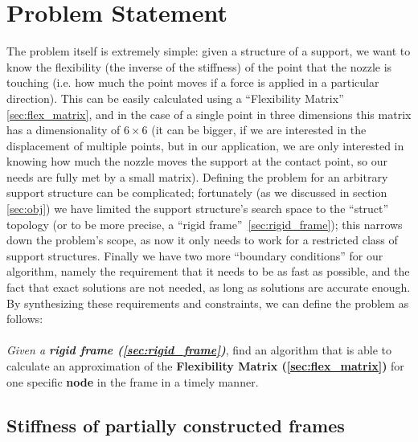 \section{Problem Statement}
\label{sec:stiff_problem_statement}
The problem itself is extremely simple: given a structure of a support, we want to know the flexibility (the inverse of the stiffness)
of the point that the nozzle is touching
(i.e. how much the point moves if a force is applied in a particular direction).
This can be easily calculated using a ``Flexibility Matrix'' \ref{sec:flex_matrix}, and in the case of a
single point in three dimensions this matrix has a dimensionality of $6 \times  6$ (it can be bigger, if we are interested in the 
displacement of multiple points, but in our application, we are only interested in knowing how much the nozzle moves
the support at the contact point, so our needs are fully met by a small matrix).
Defining the problem for an arbitrary support structure can be complicated; fortunately (as we discussed in section \ref{sec:obj})
we have limited the support structure's search space to the ``struct'' topology (or to be more precise, a ``rigid frame''~\ref{sec:rigid_frame});
this narrows down the problem's scope, as now it only needs to work for a restricted class of support structures.
Finally we have two more ``boundary conditions'' for our algorithm, namely the requirement that it needs to be as fast as possible, and the fact 
that exact solutions are not needed, as long as solutions are accurate enough. 
By synthesizing these requirements and constraints, we can define the problem as follows:
\\
\\
\noindent\textit{Given a \textbf{rigid frame (\ref{sec:rigid_frame})}}, find an algorithm that is able to calculate
an approximation of the \textbf{Flexibility Matrix (\ref{sec:flex_matrix})} for one specific \textbf{node} in the frame
in a timely manner.

\subsection{Stiffness of partially constructed frames}
\label{sec:stiffness_part_frames}


